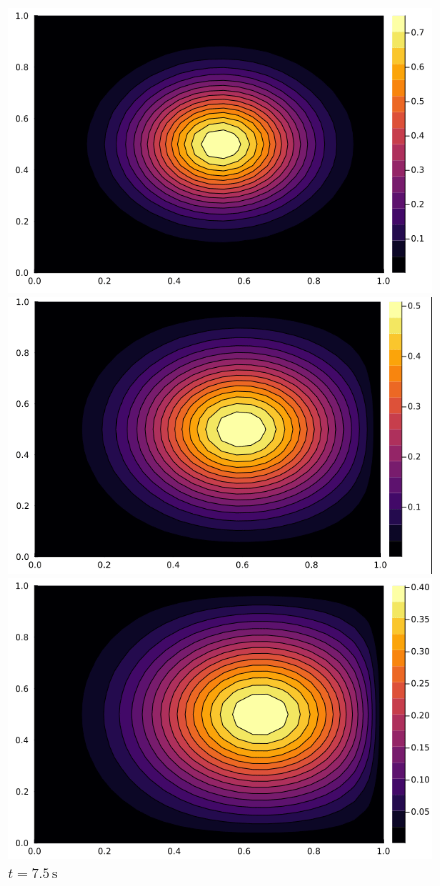 \begin{figure}[h!]
    \centering
    \begin{minipage}[b]{0.3\textwidth}
        \centering
        \includegraphics[width=\textwidth]{Figures/CD1.png}
        \caption{$t = 0\,\text{s}$}
    \end{minipage}
    \hfill
    \begin{minipage}[b]{0.3\textwidth}
        \centering
        \includegraphics[width=\textwidth]{Figures/CD2.png}
        \caption{$t = 7.5\,\text{s}$}
    \end{minipage}
    \hfill
    \begin{minipage}[b]{0.3\textwidth}
        \centering
        \includegraphics[width=\textwidth]{Figures/CD3.png}

\end{minipage}
\end{figure}
